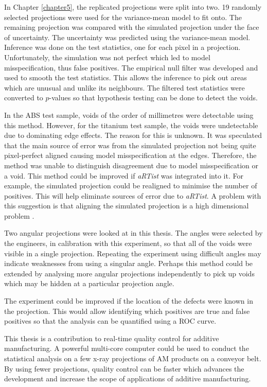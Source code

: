 \documentclass[12pt, a4paper, oneside]{memoir}
\begin{document}
In Chapter \ref{chapter5}, the replicated projections were split into two. 19 randomly selected projections were used for the variance-mean model to fit onto. The remaining projection was compared with the simulated projection under the face of uncertainty. The uncertainty was predicted using the variance-mean model. Inference was done on the test statistics, one for each pixel in a projection. Unfortunately, the simulation was not perfect which led to model misspecification, thus false positives. The empirical null filter was developed and used to smooth the test statistics. This allows the inference to pick out areas which are unusual and unlike its neighbours. The filtered test statistics were converted to $p$-values so that hypothesis testing can be done to detect the voids.

In the ABS test sample, voids of the order of millimetres were detectable using this method. However, for the titanium test sample, the voids were undetectable due to dominating edge effects. The reason for this is unknown. It was speculated that the main source of error was from the simulated projection not being quite pixel-perfect aligned causing model misspecification at the edges. Therefore, the method was unable to distinguish disagreement due to model misspecification or a void. This method could be improved if \emph{aRTist} was integrated into it. For example, the simulated projection could be realigned to minimise the number of positives. This will help eliminate sources of error due to \emph{aRTist}. A problem with this suggestion is that aligning the simulated projection is a high dimensional problem \citep{brierley2018optimized}.

Two angular projections were looked at in this thesis. The angles were selected by the engineers, in calibration with this experiment, so that all of the voids were visible in a single projection. Repeating the experiment using difficult angles may indicate weaknesses from using a singular angle. Perhaps this method could be extended by analysing more angular projections independently to pick up voids which may be hidden at a particular projection angle.

The experiment could be improved if the location of the defects were known in the projection. This would allow identifying which positives are true and false positives so that the analysis can be quantified using a ROC curve.

This thesis is a contribution to real-time quality control for additive manufacturing. A powerful multi-core computer could be used to conduct the statistical analysis on a few x-ray projections of AM products on a conveyor belt. By using fewer projections, quality control can be faster which advances the development and increase the scope of applications of additive manufacturing.




\begin{appendices}

\end{appendices}
\end{document}
